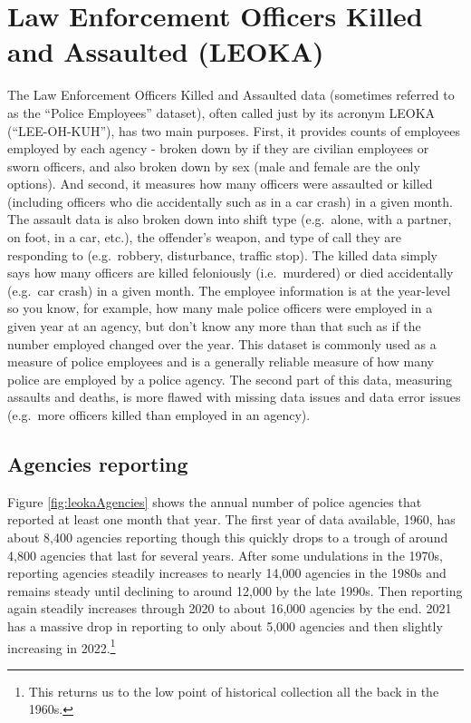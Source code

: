\documentclass[
]{krantz}
\begin{document}
\chapter{Law Enforcement Officers Killed and Assaulted
(LEOKA)}\label{leoka}

The Law Enforcement Officers Killed and Assaulted data
(sometimes referred to as the ``Police Employees'' dataset),
often called just by its acronym LEOKA (``LEE-OH-KUH''), has
two main purposes. First, it provides counts of employees
employed by each agency - broken down by if they are
civilian employees or sworn officers, and also broken down
by sex (male and female are the only options). And second,
it measures how many officers were assaulted or killed
(including officers who die accidentally such as in a car
crash) in a given month. The assault data is also broken
down into shift type (e.g.~alone, with a partner, on foot,
in a car, etc.), the offender's weapon, and type of call
they are responding to (e.g.~robbery, disturbance, traffic
stop). The killed data simply says how many officers are
killed feloniously (i.e.~murdered) or died accidentally
(e.g.~car crash) in a given month. The employee information
is at the year-level so you know, for example, how many male
police officers were employed in a given year at an agency,
but don't know any more than that such as if the number
employed changed over the year. This dataset is commonly
used as a measure of police employees and is a generally
reliable measure of how many police are employed by a police
agency. The second part of this data, measuring assaults and
deaths, is more flawed with missing data issues and data
error issues (e.g.~more officers killed than employed in an
agency).

\section{Agencies reporting}\label{agencies-reporting-3}

Figure \ref{fig:leokaAgencies} shows the annual number of
police agencies that reported at least one month that year.
The first year of data available, 1960, has about 8,400
agencies reporting though this quickly drops to a trough of
around 4,800 agencies that last for several years. After
some undulations in the 1970s, reporting agencies steadily
increases to nearly 14,000 agencies in the 1980s and remains
steady until declining to around 12,000 by the late 1990s.
Then reporting again steadily increases through 2020 to
about 16,000 agencies by the end. 2021 has a massive drop in
reporting to only about 5,000 agencies and then slightly
increasing in 2022.\footnote{This returns us to the low
  point of historical collection all the back in the 1960s.}
\end{document}
